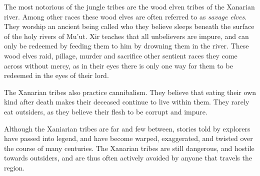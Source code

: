 The most notorious of the jungle tribes are the wood elven tribes of the
Xanarian river. Among other races these wood elves are often referred to as
\emph{savage elves}. They worship an ancient being called 
who they believe sleeps beneath the surface of the holy rivers of Mu'ut. Xir
teaches that all unbelievers are impure, and can only be redeemed by feeding
them to him by drowning them in the river. These wood elves raid, pillage,
murder and sacrifice other sentient races they come across without mercy, as
in their eyes there is only one way for them to be redeemed in the eyes of
their lord.

The Xanarian tribes also practice cannibalism. They believe that eating their
own kind after death makes their deceased continue to live within them. They
rarely eat outsiders, as they believe their flesh to be corrupt and impure.

Although the Xaniarian tribes are far and few between, stories told by
explorers have passed into legend, and have become warped, exaggerated, and
twisted over the course of many centuries. The Xanarian tribes are still
dangerous, and hostile towards outsiders, and are thus often actively avoided
by anyone that travels the region.
